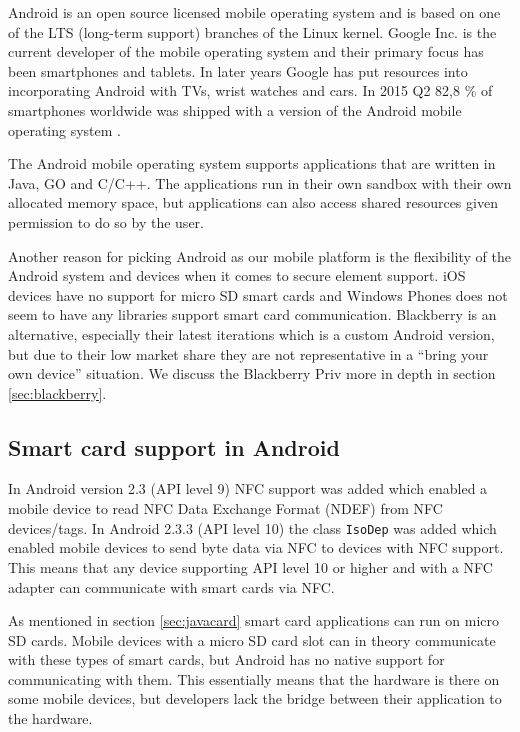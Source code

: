 Android is an open source licensed mobile operating system and is based on one of the LTS (long-term support) branches of the Linux kernel. Google Inc. \cite{google} is the current developer of the mobile operating system and their primary focus has been smartphones and tablets. In later years Google has put resources into incorporating Android with TVs, wrist watches and cars. In 2015 Q2 82,8 \% of smartphones worldwide was shipped with a version of the Android mobile operating system \cite{androidMarketShare}.

The Android mobile operating system supports applications that are written in Java, GO and C/C++. The applications run in their own sandbox with their own allocated memory space, but applications can also access shared resources given permission to do so by the user.

 Another reason for picking Android as our mobile platform is the flexibility of the Android system and devices when it comes to secure element support. iOS devices have no support for micro SD smart cards and Windows Phones does not seem to have any libraries support smart card communication. Blackberry is an alternative, especially their latest iterations which is a custom Android version, but due to their low market share they are not representative in a ``bring your own device'' situation. We discuss the Blackberry Priv more in depth in section \ref{sec:blackberry}.


\subsection{Smart card support in Android}
\label{sec:supportAndroid}
In Android version 2.3 (API level 9) NFC support was added which enabled a mobile device to read NFC Data Exchange Format (NDEF) from NFC devices/tags. In Android 2.3.3 (API level 10) the class \texttt{IsoDep} was added which enabled mobile devices to send byte data via NFC to devices with NFC support. This means that any device supporting API level 10 or higher and with a NFC adapter can communicate with smart cards via NFC.

As mentioned in section \ref{sec:javacard} smart card applications can run on micro SD cards. Mobile devices with a micro SD card slot can in theory communicate with these types of smart cards, but Android has no native support for communicating with them. This essentially means that the hardware is there on some mobile devices, but developers lack the bridge between their application to the hardware.

